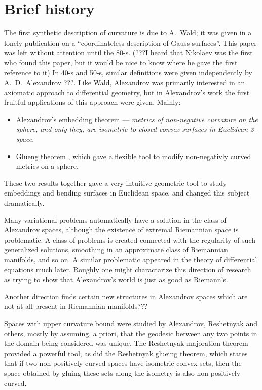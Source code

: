\section{Brief history}

The first synthetic description of curvature is due to A.~Wald; 
it was given in a lonely publication \cite{wald} on a ``coordinateless description of Gauss surfaces''.
This paper was left without attention until the 80-s.
(???I heard that Nikolaev was the first who found this paper, but it would be nice to know where he gave the first reference to it)
In 40-s and 50-s, similar definitions were given independently by A.~D.~Alexandrov ???.
Like Wald, Alexandrov was primarily interested in an axiomatic approach to differential geometry,
but in Alexandrov's work the first fruitful applications of this approach were given.
Mainly:
\begin{itemize}
\item Alexandrov's embedding theorem \cite{alexandrov-embedding} --- 
\textit{metrics of non-negative curvature on the sphere, and only they, are isometric to closed convex surfaces in Euclidean 3-space}.
\item Glueng theorem \cite{alexandrov-glueing}, which gave a flexible tool to modify non-negativly curved metrics on a sphere.
\end{itemize}
These two results together gave  a very intuitive geometric tool to study embeddings and bending surfaces in Euclidean space, and changed this subject dramatically.

Many variational problems automatically have a solution in the class of Alexandrov spaces, 
although the existence of extremal Riemannian space is problematic.
A class of problems is created connected with the regularity of such generalized solutions, smoothing in  an approximate class of Riemannian manifolds, and so on.
A similar problematic appeared in the  theory of differential equations much later.
Roughly one might charactarize this direction of research as trying to show that Alexandrov's world is just as good as Riemann's.

Another direction finds certain new structures in Alexandrov spaces  which are not at all present
 in Riemannian manifolds???

Spaces with upper curvature bound were studied by Alexandrov, Reshetnyak and others, mostly by assuming, a priori,
that the geodesic between any two points in the domain being considered was unique.
The Reshetnyak majoration theorem provided a powerful tool, as did the 
Reshetnyak glueing theorem, which states that if two non-positively curved spaces have isometric convex sets, then the space obtained by gluing these sets along the isometry is also non-positively curved.

